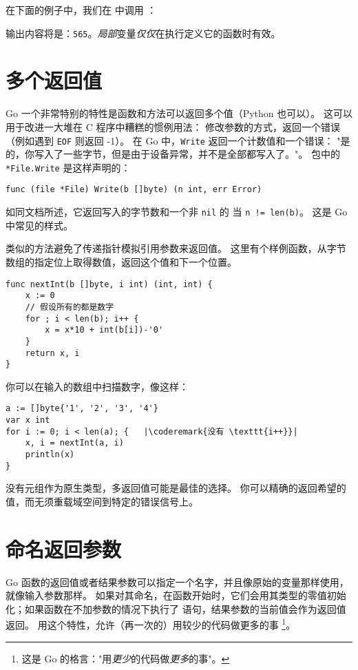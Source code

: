 在下面的例子中，我们在  中调用 ：



输出内容将是：\texttt{565}。\emph{局部}变量\emph{仅仅}在执行定义它的函数时有效。

\section{多个返回值}
\label{sec:multiple return}
Go 一个非常特别的特性是函数和方法可以返回多个值（Python 也可以）。
这可以用于改进一大堆在 C 程序中糟糕的惯例用法：
修改参数的方式，返回一个错误（例如遇到 \texttt{EOF} 则返回 -1）。
在 Go 中，\lstinline{Write} 返回一个计数值和一个错误：
"是的，你写入了一些字节，但是由于设备异常，并不是全部都写入了。"。
 包中的 \lstinline{*File.Write} 是这样声明的：
\begin{lstlisting}
func (file *File) Write(b []byte) (n int, err Error)
\end{lstlisting}
如同文档所述，它返回写入的字节数和一个非 \lstinline{nil} 的 
当 \lstinline{n != len(b)}。
这是 Go 中常见的样式。

类似的方法避免了传递指针模拟引用参数来返回值。
这里有个样例函数，从字节数组的指定位上取得数值，返回这个值和下一个位置。
\begin{lstlisting}
func nextInt(b []byte, i int) (int, int) {
    x := 0
    // 假设所有的都是数字
    for ; i < len(b); i++ {
        x = x*10 + int(b[i])-'0'
    }
    return x, i
}
\end{lstlisting}
你可以在输入的数组中扫描数字，像这样：
\begin{lstlisting}
a := []byte{'1', '2', '3', '4'}
var x int
for i := 0; i < len(a); {	|\coderemark{没有 \texttt{i++}}|
    x, i = nextInt(a, i)
    println(x)
}
\end{lstlisting}
没有元组作为原生类型，多返回值可能是最佳的选择。
你可以精确的返回希望的值，而无须重载域空间到特定的错误信号上。

\section{命名返回参数}
\label{sec:named result parameters}
Go 函数的返回值或者结果参数可以指定一个名字，并且像原始的变量那样使用，就像输入参数那样。
如果对其命名，在函数开始时，它们会用其类型的零值初始化；如果函数在不加参数的情况下执行了
 语句，结果参数的当前值会作为返回值返回。
用这个特性，允许（再一次的）用较少的代码做更多的事
\footnote{这是 Go 的格言："用\emph{更少}的代码做\emph{更多}的事"。}。

